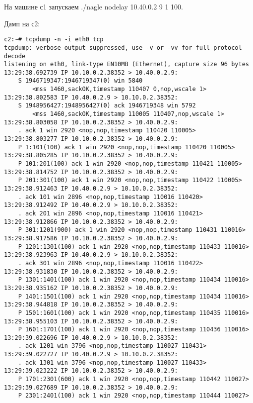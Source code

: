 \documentclass[a4paper,12pt]{article}
\begin{document}
На машине с1 запускаем ./nagle nodelay 10.40.0.2 9 1 100.

Дамп на с2:
\begin{Verbatim}
c2:~# tcpdump -n -i eth0 tcp
tcpdump: verbose output suppressed, use -v or -vv for full protocol decode
listening on eth0, link-type EN10MB (Ethernet), capture size 96 bytes
13:29:38.692739 IP 10.10.0.2.38352 > 10.40.0.2.9: 
    S 1946719347:1946719347(0) win 5840 
        <mss 1460,sackOK,timestamp 110407 0,nop,wscale 1>
13:29:38.802583 IP 10.40.0.2.9 > 10.10.0.2.38352: 
    S 1948956427:1948956427(0) ack 1946719348 win 5792 
        <mss 1460,sackOK,timestamp 110005 110407,nop,wscale 1>
13:29:38.803058 IP 10.10.0.2.38352 > 10.40.0.2.9: 
    . ack 1 win 2920 <nop,nop,timestamp 110420 110005>
13:29:38.803277 IP 10.10.0.2.38352 > 10.40.0.2.9: 
    P 1:101(100) ack 1 win 2920 <nop,nop,timestamp 110420 110005>
13:29:38.805285 IP 10.10.0.2.38352 > 10.40.0.2.9: 
    P 101:201(100) ack 1 win 2920 <nop,nop,timestamp 110421 110005>
13:29:38.814752 IP 10.10.0.2.38352 > 10.40.0.2.9: 
    P 201:301(100) ack 1 win 2920 <nop,nop,timestamp 110422 110005>
13:29:38.912463 IP 10.40.0.2.9 > 10.10.0.2.38352: 
    . ack 101 win 2896 <nop,nop,timestamp 110016 110420>
13:29:38.912492 IP 10.40.0.2.9 > 10.10.0.2.38352: 
    . ack 201 win 2896 <nop,nop,timestamp 110016 110421>
13:29:38.912866 IP 10.10.0.2.38352 > 10.40.0.2.9: 
    P 301:1201(900) ack 1 win 2920 <nop,nop,timestamp 110431 110016>
13:29:38.917586 IP 10.10.0.2.38352 > 10.40.0.2.9: 
    P 1201:1301(100) ack 1 win 2920 <nop,nop,timestamp 110433 110016>
13:29:38.923963 IP 10.40.0.2.9 > 10.10.0.2.38352: 
    . ack 301 win 2896 <nop,nop,timestamp 110016 110422>
13:29:38.931830 IP 10.10.0.2.38352 > 10.40.0.2.9: 
    P 1301:1401(100) ack 1 win 2920 <nop,nop,timestamp 110434 110016>
13:29:38.935162 IP 10.10.0.2.38352 > 10.40.0.2.9: 
    P 1401:1501(100) ack 1 win 2920 <nop,nop,timestamp 110434 110016>
13:29:38.944818 IP 10.10.0.2.38352 > 10.40.0.2.9: 
    P 1501:1601(100) ack 1 win 2920 <nop,nop,timestamp 110435 110016>
13:29:38.955103 IP 10.10.0.2.38352 > 10.40.0.2.9: 
    P 1601:1701(100) ack 1 win 2920 <nop,nop,timestamp 110436 110016>
13:29:39.022696 IP 10.40.0.2.9 > 10.10.0.2.38352: 
    . ack 1201 win 3796 <nop,nop,timestamp 110027 110431>
13:29:39.022727 IP 10.40.0.2.9 > 10.10.0.2.38352: 
    . ack 1301 win 3796 <nop,nop,timestamp 110027 110433>
13:29:39.023222 IP 10.10.0.2.38352 > 10.40.0.2.9: 
    P 1701:2301(600) ack 1 win 2920 <nop,nop,timestamp 110442 110027>
13:29:39.027689 IP 10.10.0.2.38352 > 10.40.0.2.9: 
    P 2301:2401(100) ack 1 win 2920 <nop,nop,timestamp 110444 110027>

\end{Verbatim}
\end{document}
